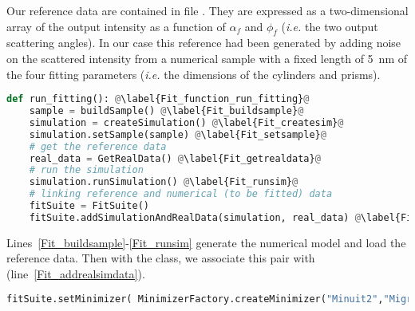 Our reference data are contained in file 
. They are expressed as a
two-dimensional array of the output intensity as a function of
$\alpha_f$ and $\phi_f$ (\textit{i.e.} the two output scattering
angles). In our case this reference had been generated by adding noise
on the scattered intensity from a numerical sample with a fixed length of 5~nm of the four fitting
parameters (\textit{i.e.} the dimensions of the cylinders and prisms).
 


\begin{lstlisting}[language=python, style=eclipseboxed,
  name=exfit,nolol]
def run_fitting(): @\label{Fit_function_run_fitting}@
    sample = buildSample() @\label{Fit_buildsample}@
    simulation = createSimulation() @\label{Fit_createsim}@
    simulation.setSample(sample) @\label{Fit_setsample}@
    # get the reference data
    real_data = GetRealData() @\label{Fit_getrealdata}@
    # run the simulation
    simulation.runSimulation() @\label{Fit_runsim}@
    # linking reference and numerical (to be fitted) data
    fitSuite = FitSuite() 
    fitSuite.addSimulationAndRealData(simulation, real_data) @\label{Fit_addrealsimdata}@
\end{lstlisting}


Lines~\ref{Fit_buildsample}-\ref{Fit_runsim} generate the numerical
model and load the reference data. Then with the 
class, we associate this pair with 
(line~\ref{Fit_addrealsimdata}).\\




\begin{lstlisting}[language=python, style=eclipseboxed,
  name=exfit,nolol]
    fitSuite.setMinimizer( MinimizerFactory.createMinimizer("Minuit2","Migrad") )  @\label{FitMinimizer}@
\end{lstlisting}

